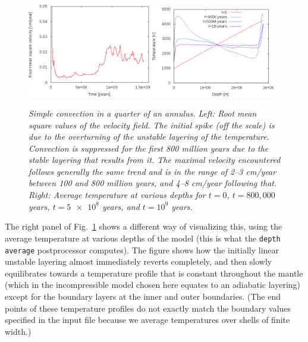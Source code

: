 \documentclass{article}
\begin{document}
\begin{figure}[tb]
\includegraphics[width=0.48\textwidth]{cookbooks/shell_simple_2d/doc/rms.png}
\hfill
\includegraphics[width=0.48\textwidth]{cookbooks/shell_simple_2d/doc/depth_average_temperature.png}
\caption{\it Simple convection in a quarter of an annulus. Left: Root mean
square values of the velocity field. The initial spike (off the scale) is due to
the overturning of the unstable layering of the temperature. Convection is suppressed for the
first 800 million years due to the stable layering that results from it. The
maximal velocity encountered follows generally the same trend and is in the
range of 2--3 cm/year between 100 and 800 million years, and 4--8 cm/year
following that. Right: Average temperature at various depths for $t=0$,
$t=800,000$ years, $t=\num{5e8}$ years, and $t=10^9$ years.}
\label{fig:simple-shell-2d-rms}
\end{figure}

The right panel of Fig.~\ref{fig:simple-shell-2d-rms} shows a different way of
visualizing this, using the average temperature at various depths of the model
(this is what the \texttt{depth average} postprocessor computes). The figure
shows how the initially linear unstable layering almost immediately reverts
completely, and then slowly equilibrates towards a temperature profile that is
constant throughout the mantle (which in the incompressible model chosen here
equates to an adiabatic layering) except for the boundary layers at the inner
and outer boundaries. (The end points of these temperature profiles do not
exactly match the boundary values specified in the input file because we
average temperatures over shells of finite width.)
\end{document}
